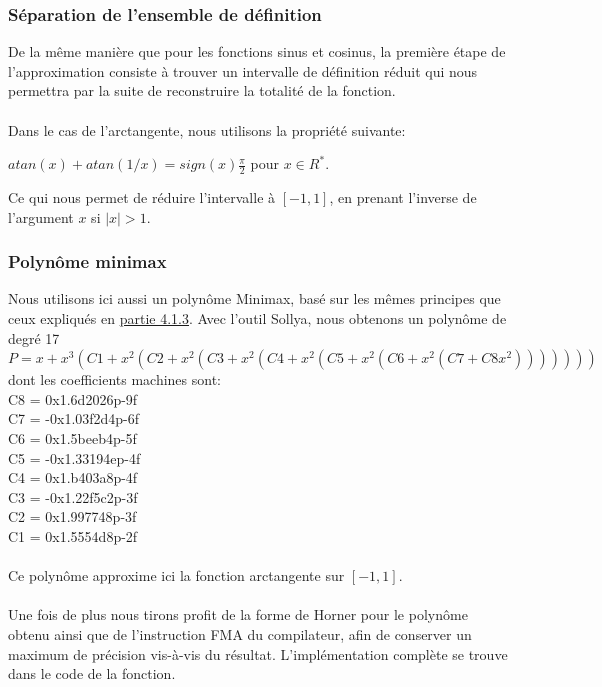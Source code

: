 \documentclass[12pt]{article}
\begin{document}
\subsubsection{Séparation de l'ensemble de définition}
De la même manière que pour les fonctions sinus et cosinus, la première étape de l'approximation
consiste à trouver un intervalle de définition réduit qui nous permettra par la suite de
reconstruire la totalité de la fonction.\\
\\
Dans le cas de l'arctangente, nous utilisons la propriété suivante:\\
\begin{center}
  $atan(x) + atan(1/x) = sign(x)\frac{\pi}{2}$ pour $x \in R^*$.
\end{center}
Ce qui nous permet de réduire l'intervalle à $[-1, 1]$, en prenant l'inverse de l'argument $x$ si
$|x| > 1$.

\subsubsection{Polynôme minimax}

Nous utilisons ici aussi un polynôme Minimax, basé sur les mêmes principes que ceux
expliqués en \hyperref[sec:minimax]{partie 4.1.3}. Avec l'outil Sollya, nous obtenons un polynôme
de degré 17 $P = x+x^3(C1 + x^2(C2+x^2(C3+x^2(C4+x^2(C5+x^2(C6+x^2(C7+C8x^2)))))))$
dont les coefficients machines sont:\\

\noindent C8 = 0x1.6d2026p-9f\\
C7 = -0x1.03f2d4p-6f\\
C6 = 0x1.5beeb4p-5f\\
C5 = -0x1.33194ep-4f\\
C4 = 0x1.b403a8p-4f\\
C3 = -0x1.22f5c2p-3f\\
C2 = 0x1.997748p-3f\\
C1 = 0x1.5554d8p-2f\\
\\
Ce polynôme approxime ici la fonction arctangente sur $[-1, 1]$.\\
\\

Une fois de plus nous tirons profit de la forme de Horner pour le polynôme obtenu ainsi que
de l'instruction FMA du compilateur, afin de conserver un maximum de précision vis-à-vis du
résultat. L'implémentation complète se trouve dans le code de la fonction.
\end{document}
